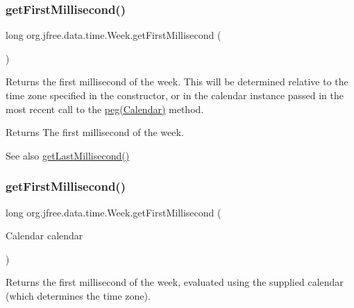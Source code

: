 \subsubsection{\texorpdfstring{get\+First\+Millisecond()}{getFirstMillisecond()}\hspace{0.1cm}{\footnotesize\ttfamily [1/2]}}
{\footnotesize\ttfamily long org.\+jfree.\+data.\+time.\+Week.\+get\+First\+Millisecond (\begin{DoxyParamCaption}{ }\end{DoxyParamCaption})}

Returns the first millisecond of the week. This will be determined relative to the time zone specified in the constructor, or in the calendar instance passed in the most recent call to the \mbox{\hyperlink{classorg_1_1jfree_1_1data_1_1time_1_1_week_ab58b703a2f1d37a0daffef7f6d509122}{peg(\+Calendar)}} method.

\begin{DoxyReturn}{Returns}
The first millisecond of the week.
\end{DoxyReturn}
\begin{DoxySeeAlso}{See also}
\mbox{\hyperlink{classorg_1_1jfree_1_1data_1_1time_1_1_week_ad26539f6b31019dcb21ec373ff07ed0e}{get\+Last\+Millisecond()}} 
\end{DoxySeeAlso}
\mbox{\label{classorg_1_1jfree_1_1data_1_1time_1_1_week_a6f48f84f8c5fab500c6b9c89ccbaae39}} 
\subsubsection{\texorpdfstring{get\+First\+Millisecond()}{getFirstMillisecond()}\hspace{0.1cm}{\footnotesize\ttfamily [2/2]}}
{\footnotesize\ttfamily long org.\+jfree.\+data.\+time.\+Week.\+get\+First\+Millisecond (\begin{DoxyParamCaption}\item[{Calendar}]{calendar }\end{DoxyParamCaption})}

Returns the first millisecond of the week, evaluated using the supplied calendar (which determines the time zone).


